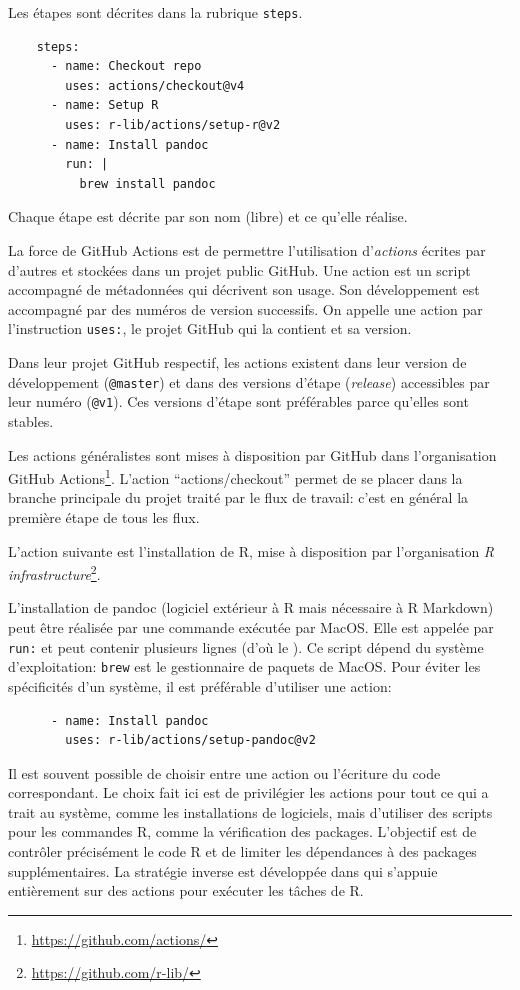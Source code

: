 \documentclass[
  12pt,
  french,
  a4paper,
  extrafontsizes,onecolumn,openright
  ]{memoir}
\begin{document}
Les étapes sont décrites dans la rubrique \texttt{steps}.

\begin{verbatim}
    steps:
      - name: Checkout repo
        uses: actions/checkout@v4
      - name: Setup R
        uses: r-lib/actions/setup-r@v2
      - name: Install pandoc
        run: |
          brew install pandoc
\end{verbatim}

Chaque étape est décrite par son nom (libre) et ce qu'elle réalise.

La force de GitHub Actions est de permettre l'utilisation d'\emph{actions} écrites par d'autres et stockées dans un projet public GitHub.
Une action est un script accompagné de métadonnées qui décrivent son usage.
Son développement est accompagné par des numéros de version successifs.
On appelle une action par l'instruction \texttt{uses:}, le projet GitHub qui la contient et sa version.

Dans leur projet GitHub respectif, les actions existent dans leur version de développement (\texttt{@master}) et dans des versions d'étape (\emph{release}) accessibles par leur numéro (\texttt{@v1}).
Ces versions d'étape sont préférables parce qu'elles sont stables.

Les actions généralistes sont mises à disposition par GitHub dans l'organisation GitHub Actions\footnote{\url{https://github.com/actions/}}.
L'action \enquote{actions/checkout} permet de se placer dans la branche principale du projet traité par le flux de travail: c'est en général la première étape de tous les flux.

L'action suivante est l'installation de R, mise à disposition par l'organisation \emph{R infrastructure}\footnote{\url{https://github.com/r-lib/}}.

L'installation de pandoc (logiciel extérieur à R mais nécessaire à R Markdown) peut être réalisée par une commande exécutée par MacOS.
Elle est appelée par \texttt{run:} et peut contenir plusieurs lignes (d'où le \texttt{\textbar{}}).
Ce script dépend du système d'exploitation: \texttt{brew} est le gestionnaire de paquets de MacOS.
Pour éviter les spécificités d'un système, il est préférable d'utiliser une action:

\begin{verbatim}
      - name: Install pandoc
        uses: r-lib/actions/setup-pandoc@v2
\end{verbatim}

Il est souvent possible de choisir entre une action ou l'écriture du code correspondant.
Le choix fait ici est de privilégier les actions pour tout ce qui a trait au système, comme les installations de logiciels, mais d'utiliser des scripts pour les commandes R, comme la vérification des packages.
L'objectif est de contrôler précisément le code R et de limiter les dépendances à des packages supplémentaires.
La stratégie inverse est développée dans \textcite{Wickham2023} qui s'appuie entièrement sur des actions pour exécuter les tâches de R.
\end{document}
